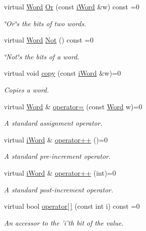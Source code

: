 \begin{DoxyCompactItemize}
virtual \hyperlink{classWord}{Word} \hyperlink{classiWord_a2f57b8b8739d1ce6c043494696a9f685}{Or} (const \hyperlink{classiWord}{iWord} \&w) const =0
\begin{DoxyCompactList}\small\item\em \char`\"{}Or\char`\"{}s the bits of two words. \item\end{DoxyCompactList}\item 
virtual \hyperlink{classWord}{Word} \hyperlink{classiWord_a6a7602a8220d84b5201a789b597fbbde}{Not} () const =0
\begin{DoxyCompactList}\small\item\em \char`\"{}Not\char`\"{}s the bits of a word. \item\end{DoxyCompactList}\item 
virtual void \hyperlink{classiWord_a0e83b184d426a1328341eaa38bc4f4b8}{copy} (const \hyperlink{classiWord}{iWord} \&w)=0
\begin{DoxyCompactList}\small\item\em Copies a word. \item\end{DoxyCompactList}\item 
virtual \hyperlink{classWord}{Word} \& \hyperlink{classiWord_a56d5d0a8d7e27cf8ef161f8e128ace83}{operator=} (const \hyperlink{classWord}{Word} w)=0
\begin{DoxyCompactList}\small\item\em A standard assignment operator. \item\end{DoxyCompactList}\item 
virtual \hyperlink{classiWord}{iWord} \& \hyperlink{classiWord_af20040c25b79d2aeae41f1714fbb2cbc}{operator++} ()=0
\begin{DoxyCompactList}\small\item\em A standard pre-\/increment operator. \item\end{DoxyCompactList}\item 
virtual \hyperlink{classiWord}{iWord} \& \hyperlink{classiWord_a6777f6f41915179c4255d3647a9eb4b5}{operator++} (int)=0
\begin{DoxyCompactList}\small\item\em A standard post-\/increment operator. \item\end{DoxyCompactList}\item 
virtual bool \hyperlink{classiWord_a0e83901b08763247527ce61c89fd847f}{operator\mbox{[}$\,$\mbox{]}} (const int i) const =0
\begin{DoxyCompactList}\small\item\em An accessor to the 'i'th bit of the value. \item\end{DoxyCompactList}\end{DoxyCompactItemize}


